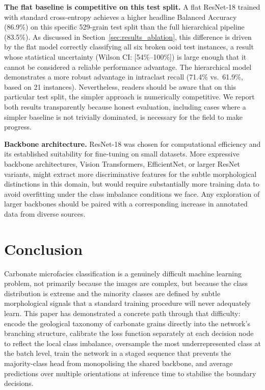 \documentclass[a4paper,fleqn]{cas-dc}
\begin{document}
\textbf{The flat baseline is competitive on this test split.} A flat ResNet-18 trained with standard cross-entropy achieves a higher headline Balanced Accuracy (86.9\%) on this specific 529-grain test split than the full hierarchical pipeline (83.5\%). As discussed in Section~\ref{sec:results_ablation}, this difference is driven by the flat model correctly classifying all six broken ooid test instances, a result whose statistical uncertainty (Wilson CI: [54\%--100\%]) is large enough that it cannot be considered a reliable performance advantage. The hierarchical model demonstrates a more robust advantage in intraclast recall (71.4\% vs.\ 61.9\%, based on 21 instances). Nevertheless, readers should be aware that on this particular test split, the simpler approach is numerically competitive. We report both results transparently because honest evaluation, including cases where a simpler baseline is not trivially dominated, is necessary for the field to make progress.

\textbf{Backbone architecture.} ResNet-18 was chosen for computational efficiency and its established suitability for fine-tuning on small datasets. More expressive backbone architectures, Vision Transformers, EfficientNet, or larger ResNet variants, might extract more discriminative features for the subtle morphological distinctions in this domain, but would require substantially more training data to avoid overfitting under the class imbalance conditions we face. Any exploration of larger backbones should be paired with a corresponding increase in annotated data from diverse sources.

\section{Conclusion}

Carbonate microfacies classification is a genuinely difficult machine learning problem, not primarily because the images are complex, but because the class distribution is extreme and the minority classes are defined by subtle morphological signals that a standard training procedure will never adequately learn. This paper has demonstrated a concrete path through that difficulty: encode the geological taxonomy of carbonate grains directly into the network's branching structure, calibrate the loss function separately at each decision node to reflect the local class imbalance, oversample the most underrepresented class at the batch level, train the network in a staged sequence that prevents the majority-class head from monopolising the shared backbone, and average predictions over multiple orientations at inference time to stabilise the boundary decisions.
\end{document}
